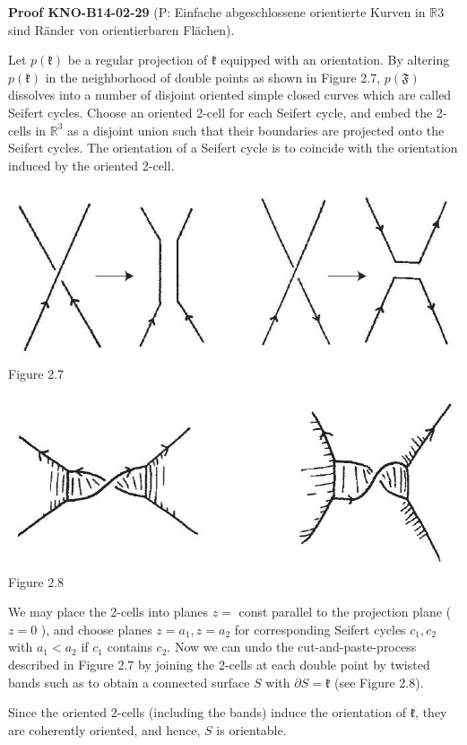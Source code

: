 \documentclass[10pt, letterpaper]{article}
\newcommand{\R}{\mathbb{R}}
\newcommand{\CustomHeading}[3]{%
  \par\medskip\noindent%
  \textbf{#1 #2} \textnormal{(#3)}.\enskip%
}
\newenvironment{PROOF}[2]{\begin{unitbox}\CustomHeading{Proof}{#1}{#2}}{\end{unitbox}}
\begin{document}
\begin{PROOF}{KNO-B14-02-29}{P: Einfache abgeschlossene orientierte Kurven in $\R3$ sind Ränder von orientierbaren Flächen}
Let $p(\mathfrak{k})$ be a regular projection of $\mathfrak{k}$ equipped with an orientation. By altering $p(\mathfrak{k})$ in the neighborhood of double points as shown in Figure 2.7, $p(\mathfrak{F})$ dissolves into a number of disjoint oriented simple closed curves which are called Seifert cycles. Choose an oriented 2-cell for each Seifert cycle, and embed the 2-cells in $\mathbb{R}^{3}$ as a disjoint union such that their boundaries are projected onto the Seifert cycles. The orientation of a Seifert cycle is to coincide with the orientation induced by the oriented 2-cell.

\includegraphics[scale=0.2, center]{2025_05_21_9c06be8de7a55410f8c1g-034}
Figure 2.7

\includegraphics[scale=0.2, center]{2025_05_21_9c06be8de7a55410f8c1g-034(1)}
Figure 2.8

We may place the 2-cells into planes $z=$ const parallel to the projection plane ( $z=0$ ), and choose planes $z=a_{1}, z=a_{2}$ for corresponding Seifert cycles $c_{1}, c_{2}$ with $a_{1}<a_{2}$ if $c_{1}$ contains $c_{2}$. Now we can undo the cut-and-paste-process described in Figure 2.7 by joining the 2-cells at each double point by twisted bands such as to obtain a connected surface $S$ with $\partial S=\mathfrak{k}$ (see Figure 2.8).

Since the oriented 2-cells (including the bands) induce the orientation of $\mathfrak{k}$, they are coherently oriented, and hence, $S$ is orientable.
\end{PROOF}
\end{document}
